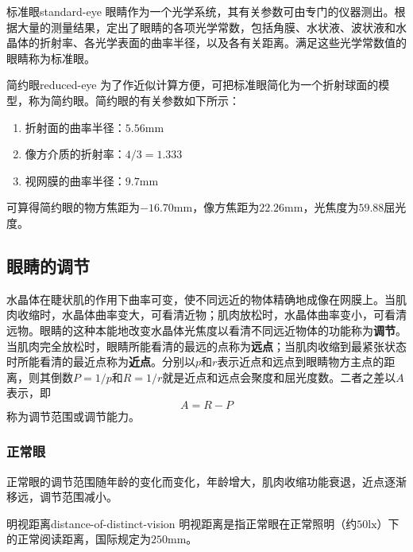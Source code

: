 \documentclass[cn,10pt,chinesefont=founder,math=newtx,cite=super,twoside]{elegantbook}
\begin{document}
\begin{definition}{标准眼}{standard-eye}
	眼睛作为一个光学系统，其有关参数可由专门的仪器测出。根据大量的测量结果，定出了眼睛的各项光学常数，包括角膜、水状液、波状液和水晶体的折射率、各光学表面的曲率半径，以及各有关距离。满足这些光学常数值的眼睛称为标准眼。
\end{definition}

\begin{definition}{简约眼}{reduced-eye}
	为了作近似计算方便，可把标准眼简化为一个折射球面的模型，称为简约眼。简约眼的有关参数如下所示：
	\begin{enumerate}
		\item 折射面的曲率半径：$5.56\mathrm{mm}$
		\item 像方介质的折射率：$4/3=1.333$
		\item 视网膜的曲率半径：$9.7\mathrm{mm}$
	\end{enumerate}
	可算得简约眼的物方焦距为$-16.70\mathrm{mm}$，像方焦距为$22.26\mathrm{mm}$，光焦度为$59.88$屈光度。
\end{definition}

\subsection{眼睛的调节}
水晶体在睫状肌的作用下曲率可变，使不同远近的物体精确地成像在网膜上。当肌肉收缩时，水晶体曲率变大，可看清近物；肌肉放松时，水晶体曲率变小，可看清远物。眼睛的这种本能地改变水晶体光焦度以看清不同远近物体的功能称为\textbf{调节}。当肌肉完全放松时，眼睛所能看清的最远的点称为\textbf{远点}；当肌肉收缩到最紧张状态时所能看清的最近点称为\textbf{近点}。分别以$p$和$r$表示近点和远点到眼睛物方主点的距离，则其倒数$P=1/p$和$R=1/r$就是近点和远点会聚度和屈光度数。二者之差以$A$表示，即
\begin{equation}
A=R-P
\end{equation}
称为调节范围或调节能力。

\subsubsection{正常眼}
正常眼的调节范围随年龄的变化而变化，年龄增大，肌肉收缩功能衰退，近点逐渐移远，调节范围减小。

\begin{definition}{明视距离}{distance-of-distinct-vision}
	明视距离是指正常眼在正常照明（约$50\mathrm{lx}$）下的正常阅读距离，国际规定为$250\mathrm{mm}$。
\end{definition}
\end{document}
